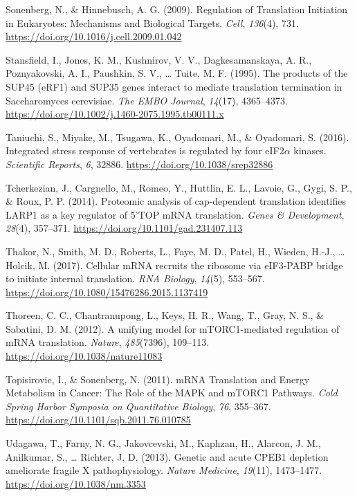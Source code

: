 \documentclass[12pt,openany]{book}
\begin{document}
\hypertarget{ref-Sonenberg2009}{}
Sonenberg, N., \& Hinnebusch, A. G. (2009). Regulation of Translation
Initiation in Eukaryotes: Mechanisms and Biological Targets.
\emph{Cell}, \emph{136}(4), 731.
\url{https://doi.org/10.1016/j.cell.2009.01.042}

\hypertarget{ref-Stansfield1995}{}
Stansfield, I., Jones, K. M., Kushnirov, V. V., Dagkesamanskaya, A. R.,
Poznyakovski, A. I., Paushkin, S. V., \ldots{} Tuite, M. F. (1995). The
products of the SUP45 (eRF1) and SUP35 genes interact to mediate
translation termination in Saccharomyces cerevisiae. \emph{The EMBO
Journal}, \emph{14}(17), 4365--4373.
\url{https://doi.org/10.1002/j.1460-2075.1995.tb00111.x}

\hypertarget{ref-Taniuchi2016}{}
Taniuchi, S., Miyake, M., Tsugawa, K., Oyadomari, M., \& Oyadomari, S.
(2016). Integrated stress response of vertebrates is regulated by four
eIF2\(\alpha\) kinases. \emph{Scientific Reports}, \emph{6}, 32886.
\url{https://doi.org/10.1038/srep32886}

\hypertarget{ref-Tcherkezian2014}{}
Tcherkezian, J., Cargnello, M., Romeo, Y., Huttlin, E. L., Lavoie, G.,
Gygi, S. P., \& Roux, P. P. (2014). Proteomic analysis of cap-dependent
translation identifies LARP1 as a key regulator of 5'TOP mRNA
translation. \emph{Genes \& Development}, \emph{28}(4), 357--371.
\url{https://doi.org/10.1101/gad.231407.113}

\hypertarget{ref-Thakor2017}{}
Thakor, N., Smith, M. D., Roberts, L., Faye, M. D., Patel, H., Wieden,
H.-J., \ldots{} Holcik, M. (2017). Cellular mRNA recruits the ribosome
via eIF3-PABP bridge to initiate internal translation. \emph{RNA
Biology}, \emph{14}(5), 553--567.
\url{https://doi.org/10.1080/15476286.2015.1137419}

\hypertarget{ref-Thoreen2012}{}
Thoreen, C. C., Chantranupong, L., Keys, H. R., Wang, T., Gray, N. S.,
\& Sabatini, D. M. (2012). A unifying model for mTORC1-mediated
regulation of mRNA translation. \emph{Nature}, \emph{485}(7396),
109--113. \url{https://doi.org/10.1038/nature11083}

\hypertarget{ref-Topisirovic2011}{}
Topisirovic, I., \& Sonenberg, N. (2011). mRNA Translation and Energy
Metabolism in Cancer: The Role of the MAPK and mTORC1 Pathways.
\emph{Cold Spring Harbor Symposia on Quantitative Biology}, \emph{76},
355--367. \url{https://doi.org/10.1101/sqb.2011.76.010785}

\hypertarget{ref-Udagawa2013}{}
Udagawa, T., Farny, N. G., Jakovcevski, M., Kaphzan, H., Alarcon, J. M.,
Anilkumar, S., \ldots{} Richter, J. D. (2013). Genetic and acute CPEB1
depletion ameliorate fragile X pathophysiology. \emph{Nature Medicine},
\emph{19}(11), 1473--1477. \url{https://doi.org/10.1038/nm.3353}
\end{document}
